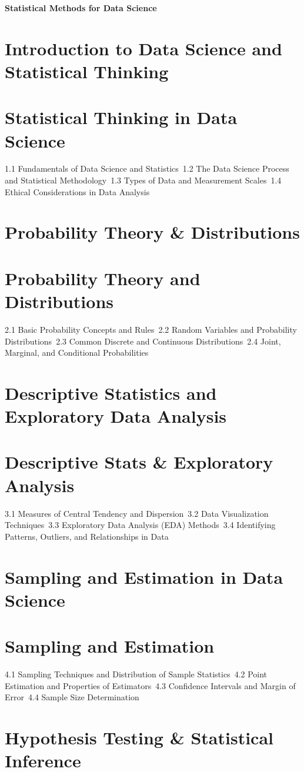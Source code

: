 {\LARGE \bf{Statistical Methods for Data Science}}
\section{Introduction to Data Science and Statistical Thinking}
\section{Statistical Thinking in Data Science}
1.1 Fundamentals of Data Science and Statistics\
1.2 The Data Science Process and Statistical Methodology\
1.3 Types of Data and Measurement Scales\
1.4 Ethical Considerations in Data Analysis\
\section{Probability Theory \& Distributions}
\section{Probability Theory and Distributions}
2.1 Basic Probability Concepts and Rules\
2.2 Random Variables and Probability Distributions\
2.3 Common Discrete and Continuous Distributions\
2.4 Joint, Marginal, and Conditional Probabilities\
\section{Descriptive Statistics and Exploratory Data Analysis}
\section{Descriptive Stats \& Exploratory Analysis}
3.1 Measures of Central Tendency and Dispersion\
3.2 Data Visualization Techniques\
3.3 Exploratory Data Analysis (EDA) Methods\
3.4 Identifying Patterns, Outliers, and Relationships in Data\
\section{Sampling and Estimation in Data Science}
\section{Sampling and Estimation}
4.1 Sampling Techniques and Distribution of Sample Statistics\
4.2 Point Estimation and Properties of Estimators\
4.3 Confidence Intervals and Margin of Error\
4.4 Sample Size Determination\
\section{Hypothesis Testing \& Statistical Inference}
